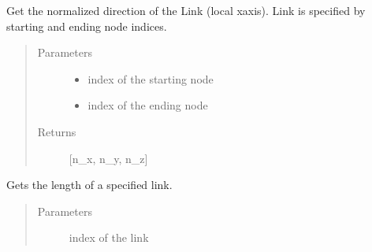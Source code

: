 \documentclass[letterpaper,10pt,english]{sphinxmanual}
\begin{document}
\begin{fulllineitems}
\begin{fulllineitems}
\end{fulllineitems}


\begin{fulllineitems}
\label{\detokenize{api:beamon.database.database.Database.get_link_direction}}
Get the normalized direction of the Link (local x\sphinxhyphen{}axis). Link is specified by starting and
ending node indices.
\begin{quote}\begin{description}
\item[{Parameters}] \leavevmode\begin{itemize}
\item {} 
 \textendash{} index of the starting node

\item {} 
 \textendash{} index of the ending node

\end{itemize}

\item[{Returns}] \leavevmode
{[}n\_x, n\_y, n\_z{]}

\end{description}\end{quote}

\end{fulllineitems}


\begin{fulllineitems}
\label{\detokenize{api:beamon.database.database.Database.get_link_length}}
Gets the length of a specified link.
\begin{quote}\begin{description}
\item[{Parameters}] \leavevmode
{} \textendash{} index of the link


\end{description}
\end{quote}
\end{fulllineitems}
\end{fulllineitems}
\end{document}
